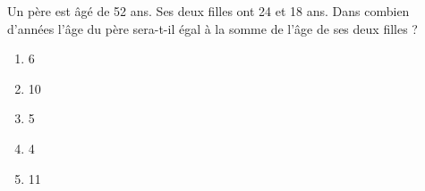 Un père est âgé de 52 ans. Ses deux filles ont 24 et 18 ans. Dans combien d'années l'âge du père sera-t-il égal à la somme de l'âge de ses deux filles ?
\begin{multicols}{5}
  \begin{enumerate}[A/]
  \item 6
  \item 10
  \item 5
  \item 4
  \item 11
  \end{enumerate}
\end{multicols}